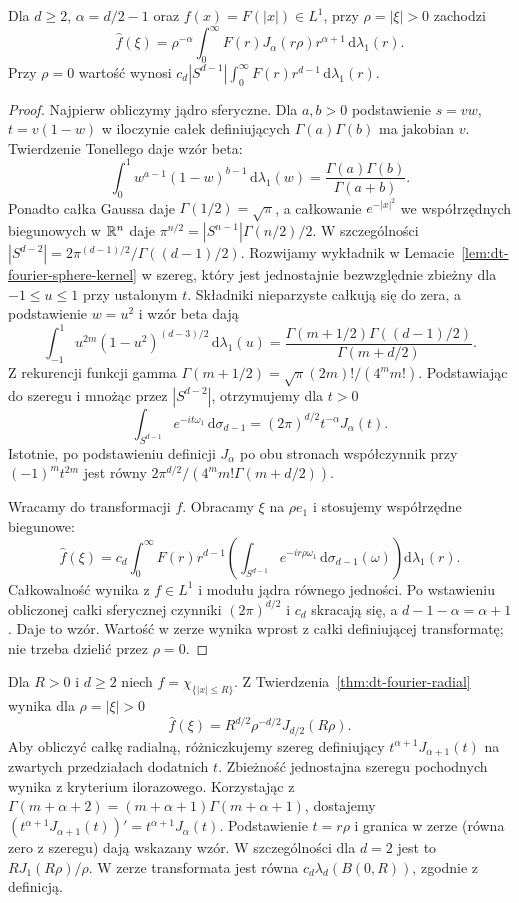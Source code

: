 \begin{twierdzenie}
\label{thm:dt-fourier-radial}
Dla $d\ge2$, $\alpha=d/2-1$ oraz $f(x)=F(|x|)\in L^1$,
przy $\rho=|\xi|>0$ zachodzi
\[
 \widehat f(\xi)=\rho^{-\alpha}\int_0^\infty
 F(r)J_\alpha(r\rho)r^{\alpha+1}\,\mathrm d\lambda_1(r).
\]
Przy $\rho=0$ wartość wynosi
$c_d|S^{d-1}|\int_0^\infty F(r)r^{d-1}\,\mathrm d\lambda_1(r)$.
\end{twierdzenie}
\begin{proof}
Najpierw obliczymy jądro sferyczne. Dla $a,b>0$
podstawienie $s=vw$, $t=v(1-w)$ w iloczynie całek
definiujących $\Gamma(a)\Gamma(b)$ ma jakobian $v$.
Twierdzenie Tonellego daje wzór beta:
\[
 \int_0^1 w^{a-1}(1-w)^{b-1}\,\mathrm d\lambda_1(w)
 =\frac{\Gamma(a)\Gamma(b)}{\Gamma(a+b)}.
\]
Ponadto całka Gaussa daje $\Gamma(1/2)=\sqrt{\pi}$,
a całkowanie $e^{-|x|^2}$ we współrzędnych biegunowych
w $\mathbb R^n$ daje
$\pi^{n/2}=|S^{n-1}|\Gamma(n/2)/2$.
W szczególności $|S^{d-2}|=2\pi^{(d-1)/2}/\Gamma((d-1)/2)$.
Rozwijamy wykładnik w Lemacie~\ref{lem:dt-fourier-sphere-kernel}
w szereg, który jest jednostajnie bezwzględnie zbieżny
dla $-1\le u\le1$ przy ustalonym $t$.
Składniki nieparzyste całkują się do zera, a podstawienie
$w=u^2$ i wzór beta dają
\[
 \int_{-1}^1 u^{2m}(1-u^2)^{(d-3)/2}\,\mathrm d\lambda_1(u)
 =\frac{\Gamma(m+1/2)\Gamma((d-1)/2)}{\Gamma(m+d/2)}.
\]
Z rekurencji funkcji gamma
$\Gamma(m+1/2)=\sqrt{\pi}(2m)!/(4^m m!)$.
Podstawiając do szeregu i mnożąc przez $|S^{d-2}|$,
otrzymujemy dla $t>0$
\[
 \int_{S^{d-1}}e^{-it\omega_1}\,\mathrm d\sigma_{d-1}
 =(2\pi)^{d/2}t^{-\alpha}J_\alpha(t).
\]
Istotnie, po podstawieniu definicji $J_\alpha$ po obu
stronach współczynnik przy $(-1)^mt^{2m}$ jest równy
$2\pi^{d/2}/(4^m m!\Gamma(m+d/2))$.

Wracamy do transformacji $f$. Obracamy $\xi$ na
$\rho e_1$ i stosujemy współrzędne biegunowe:
\[
 \widehat f(\xi)=c_d\int_0^\infty F(r)r^{d-1}
 \left(\int_{S^{d-1}}e^{-ir\rho\omega_1}
 \,\mathrm d\sigma_{d-1}(\omega)\right)\mathrm d\lambda_1(r).
\]
Całkowalność wynika z $f\in L^1$ i modułu jądra równego
jedności. Po wstawieniu obliczonej całki sferycznej
czynniki $(2\pi)^{d/2}$ i $c_d$ skracają się, a
$d-1-\alpha=\alpha+1$. Daje to wzór.
Wartość w zerze wynika wprost z całki definiującej
transformatę; nie trzeba dzielić przez $\rho=0$.
\end{proof}

\begin{przyklad}
\label{ex:dt-fourier-ball}
Dla $R>0$ i $d\ge2$ niech $f=\chi_{\{|x|\le R\}}$.
Z Twierdzenia~\ref{thm:dt-fourier-radial} wynika dla
$\rho=|\xi|>0$
\[
 \widehat f(\xi)=R^{d/2}\rho^{-d/2}J_{d/2}(R\rho).
\]
Aby obliczyć całkę radialną, różniczkujemy szereg
definiujący $t^{\alpha+1}J_{\alpha+1}(t)$ na zwartych
przedziałach dodatnich $t$. Zbieżność jednostajna
szeregu pochodnych wynika z kryterium ilorazowego.
Korzystając z $\Gamma(m+\alpha+2)=(m+\alpha+1)\Gamma(m+\alpha+1)$,
dostajemy
$(t^{\alpha+1}J_{\alpha+1}(t))'=t^{\alpha+1}J_\alpha(t)$.
Podstawienie $t=r\rho$ i granica w zerze (równa zero
z szeregu) dają wskazany wzór. W szczególności dla $d=2$
jest to $R J_1(R\rho)/\rho$. W zerze transformata jest
równa $c_d\lambda_d(B(0,R))$, zgodnie z definicją.
\end{przyklad}
